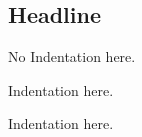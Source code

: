 \documentclass[10pt,parindent]{scrartcl}
\begin{document}
 \subsection*{Headline}

No Indentation here.

Indentation here.

Indentation here.
\end{document}
